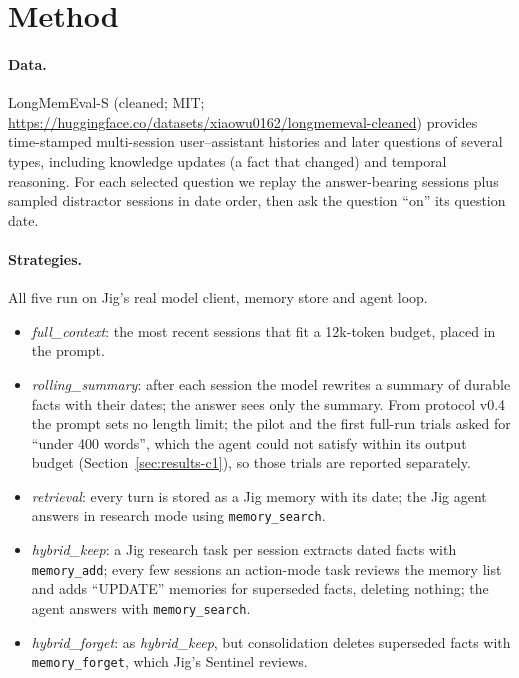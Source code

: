 \section{Method}
\label{sec:method}

\paragraph{Data.} LongMemEval-S (cleaned; MIT; \url{https://huggingface.co/datasets/xiaowu0162/longmemeval-cleaned})
provides time-stamped multi-session user--assistant histories and later questions of several types,
including knowledge updates (a fact that changed) and temporal reasoning. For each selected question we
replay the answer-bearing sessions plus sampled distractor sessions in date order, then ask the question
``on'' its question date.

\paragraph{Strategies.} All five run on Jig's real model client, memory store and agent loop.
\begin{itemize}
\item \emph{full\_context}: the most recent sessions that fit a 12k-token budget, placed in the prompt.
\item \emph{rolling\_summary}: after each session the model rewrites a summary of durable facts with their
  dates; the answer sees only the summary. From protocol v0.4 the prompt sets no length limit; the pilot
  and the first full-run trials asked for ``under 400 words'', which the agent could not satisfy within its
  output budget (Section~\ref{sec:results-c1}), so those trials are reported separately.
\item \emph{retrieval}: every turn is stored as a Jig memory with its date; the Jig agent answers in
  research mode using \texttt{memory\_search}.
\item \emph{hybrid\_keep}: a Jig research task per session extracts dated facts with
  \texttt{memory\_add}; every few sessions an action-mode task reviews the memory list and adds
  ``UPDATE'' memories for superseded facts, deleting nothing; the agent answers with
  \texttt{memory\_search}.
\item \emph{hybrid\_forget}: as \emph{hybrid\_keep}, but consolidation deletes superseded facts with
  \texttt{memory\_forget}, which Jig's Sentinel reviews.
\end{itemize}

